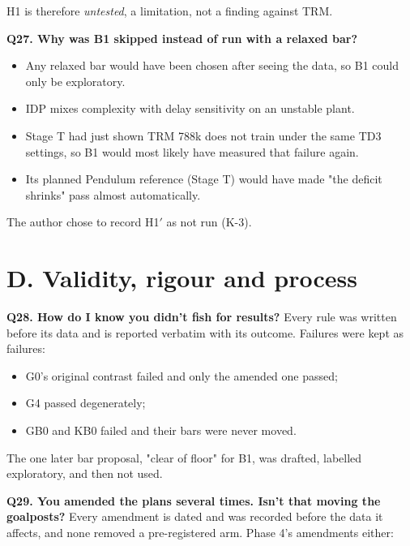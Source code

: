\documentclass[11pt]{article}
\begin{document}
H1 is therefore \emph{untested}, a limitation, not a finding against TRM.



\textbf{Q27. Why was B1 skipped instead of run with a relaxed bar?}

\begin{itemize}
\item Any relaxed bar would have been chosen after seeing the data, so B1 could only be exploratory.
\item IDP mixes complexity with delay sensitivity on an unstable plant.
\item Stage T had just shown TRM 788k does not train under the same TD3 settings, so B1 would most likely have measured that failure again.
\item Its planned Pendulum reference (Stage T) would have made "the deficit shrinks" pass almost automatically.
\end{itemize}



The author chose to record H1$'$ as not run (K-3).



\section*{D. Validity, rigour and process}



\textbf{Q28. How do I know you didn't fish for results?} Every rule was written before its data and is reported verbatim with its outcome. Failures were kept as failures:

\begin{itemize}
\item G0's original contrast failed and only the amended one passed;
\item G4 passed degenerately;
\item GB0 and KB0 failed and their bars were never moved.
\end{itemize}



The one later bar proposal, "clear of floor" for B1, was drafted, labelled exploratory, and then not used.



\textbf{Q29. You amended the plans several times. Isn't that moving the goalposts?} Every amendment is dated and was recorded before the data it affects, and none removed a pre-registered arm. Phase 4's amendments either:
\end{document}
